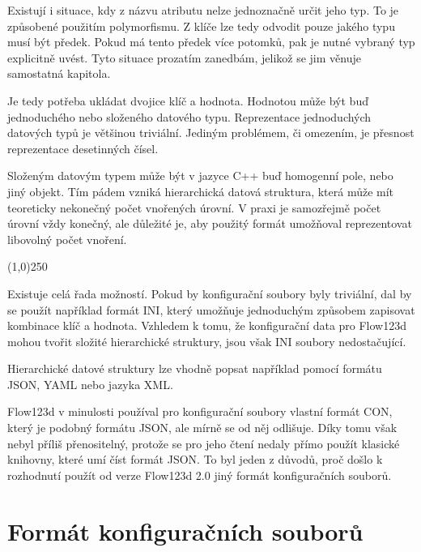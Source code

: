 \documentclass[FM,DP]{tulthesis}
\begin{document}
Existují i situace, kdy z názvu atributu nelze jednoznačně určit jeho typ. To je způsobené použitím polymorfismu. Z klíče lze tedy odvodit pouze jakého typu musí být předek. Pokud má tento předek více potomků, pak je nutné vybraný typ explicitně uvést. Tyto situace prozatím zanedbám, jelikož se jim věnuje samostatná kapitola.

Je tedy potřeba ukládat dvojice klíč a hodnota. Hodnotou může být buď jednoduchého nebo složeného datového typu. Reprezentace jednoduchých datových typů je většinou triviální. Jediným problémem, či omezením, je přesnost reprezentace desetinných čísel.

Složeným datovým typem může být v jazyce C++ buď homogenní pole, nebo jiný objekt. Tím pádem vzniká hierarchická datová struktura, která může mít teoreticky nekonečný počet vnořených úrovní. V praxi je samozřejmě počet úrovní vždy konečný, ale důležité je, aby použitý formát umožňoval reprezentovat libovolný počet vnoření.

\begin{center}
\line(1,0){250}
\end{center}

Existuje celá řada možností. Pokud by konfigurační soubory byly triviální, dal by se použít například formát INI, který umožňuje jednoduchým způsobem zapisovat kombinace klíč a hodnota. Vzhledem k tomu, že konfigurační data pro Flow123d mohou tvořit složité hierarchické struktury, jsou však INI soubory nedostačující.

 Hierarchické datové struktury lze vhodně popsat například pomocí formátu JSON, YAML nebo jazyka XML. 


Flow123d v minulosti používal pro konfigurační soubory vlastní formát CON, který je podobný formátu JSON, ale mírně se od něj odlišuje. Díky tomu však nebyl příliš přenositelný, protože se pro jeho čtení nedaly přímo použít klasické knihovny, které umí číst formát JSON. To byl jeden z důvodů, proč došlo k rozhodnutí použít od verze Flow123d 2.0 jiný formát konfiguračních souborů. 


\section{Formát konfiguračních souborů}
\end{document}
